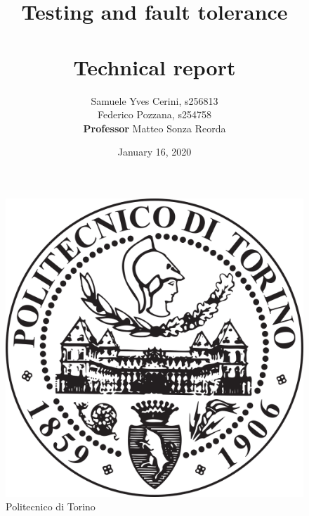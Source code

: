 \documentclass{article}
\title{\LARGE Testing and fault tolerance\\ \textbf{\huge }\\ \Large Technical report \vspace*{0.3in}   }
\author{Samuele Yves Cerini, s256813\\
        Federico Pozzana, s254758 \\
\textbf{Professor} Matteo Sonza Reorda \vspace*{2.0in}}
\date{January 16, 2020}
\begin{document}
\thispagestyle{empty}

\begin{figure}
    \centering
    \includegraphics[scale=0.1]{PoliLogo.png}
    \captionsetup{labelformat=empty}
    \caption {\LARGE Politecnico di Torino}
\end{figure}

\maketitle

\thispagestyle{empty}
\tableofcontents
\newpage

%
%
\end{document}
